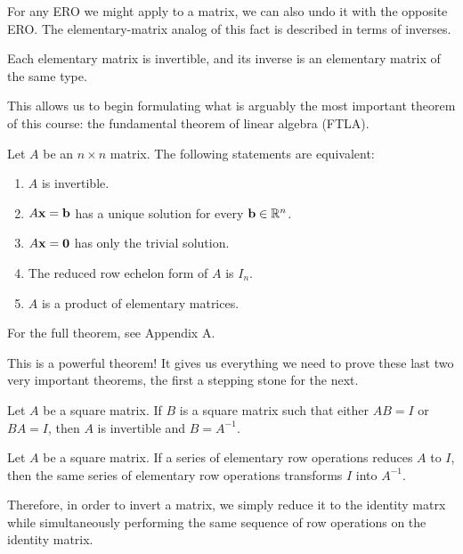 \documentclass[../m73main.tex]{subfiles}
\begin{document}
For any ERO we might apply to a matrix, we can also undo it with the opposite ERO.
The elementary-matrix analog of this fact is described in terms of inverses.

\begin{theorem}
	Each elementary matrix is invertible, and its inverse is an elementary matrix of the same type.
\end{theorem}

This allows us to begin formulating what is arguably the most important theorem of this course: the fundamental theorem of linear algebra (FTLA).

\begin{theorem}
	Let $A$ be an $n\times n$ matrix.
	The following statements are equivalent:
	\begin{enumerate}[label=(\alph*)]
		\item $A$ is invertible.
		\item $A\mathbf{x}= \mathbf{b}$ has a unique solution for every $\mathbf{b}\in\mathbb{R}^n$.
		\item $A\mathbf{x}=\mathbf{0}$ has only the trivial solution.
		\item The reduced row echelon form of $A$ is $I_n$.
		\item $A$ is a product of elementary matrices.
	\end{enumerate}
	For the full theorem, see Appendix A.
\end{theorem}

This is a powerful theorem!
It gives us everything we need to prove these last two very important theorems, the first a stepping stone for the next.

\begin{theorem}
	Let $A$ be a square matrix.
	If $B$ is a square matrix such that either $AB = I$ or $BA = I$, then $A$ is invertible and $B = A^{-1}$.
\end{theorem}

\begin{theorem}
	Let $A$ be a square matrix.
	If a series of elementary row operations reduces $A$ to $I$, then the same series of elementary row operations transforms $I$ into $A^{-1}$.
\end{theorem}

Therefore, in order to invert a matrix, we simply reduce it to the identity matrx while simultaneously performing the same sequence of row operations on the identity matrix.
\end{document}
